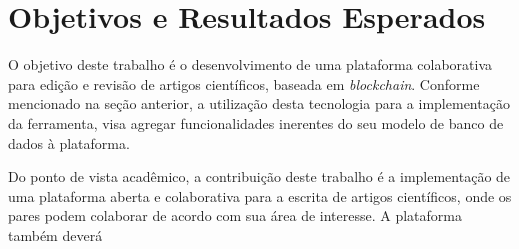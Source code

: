 \chapter{Objetivos e Resultados Esperados}
O objetivo deste trabalho é o desenvolvimento de uma plataforma colaborativa para edição e revisão de artigos científicos, baseada em \textit{blockchain}. Conforme mencionado na seção anterior, a utilização desta tecnologia para a implementação da ferramenta, visa agregar funcionalidades inerentes do seu modelo de banco de dados à plataforma.

Do ponto de vista acadêmico, a contribuição deste trabalho é a implementação de uma plataforma aberta e colaborativa para a escrita de artigos científicos, onde os pares podem colaborar de acordo com sua área de interesse. A plataforma também deverá 